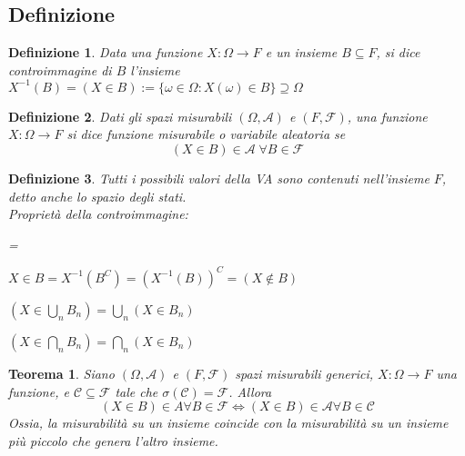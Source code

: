 \documentclass[a4paper,12pt]{article}
\theoremstyle{break}
\newtheorem{theorem}{Teorema}[section]
\newtheorem{definition}{Definizione}[section]
\numberwithin{equation}{section}
\begin{document}
\subsection{Definizione}
\begin{definition}
  Data una funzione \(X : \Omega \to F\) e un insieme \(B \subseteq F\), si dice controimmagine di \(B\) l'insieme \(X^{-1}(B) = (X \in B) := \{\omega \in \Omega : X (\omega) \in B\} \supseteq \Omega\) 
\end{definition}
\begin{definition}
  Dati gli spazi misurabili \((\Omega, \mathcal{A})\) e \((F, \mathcal{F})\), una funzione \(X : \Omega \to F\) si dice funzione misurabile o variabile aleatoria se 
  \[
    (X \in B) \in \mathcal{A} \; \forall B \in \mathcal{F}
  \]
\end{definition}
\begin{definition}
  Tutti i possibili valori della VA sono contenuti nell'insieme \(F\), detto anche lo spazio degli stati. \\
  Proprietà della controimmagine:
  \begin{itemize}
    {\everymath = {\displaystyle}
    \item \(X \in B = X^{-1}(B^C) = (X^{-1}(B))^C = (X \not \in B)\)
    \item \((X \in \bigcup_n B_n) = \bigcup_n (X \in B_n)\)
    \item \((X \in \bigcap_n B_n) = \bigcap_n (X \in B_n)\)
    }
    \end{itemize}
\end{definition}
\begin{theorem}
  Siano \((\Omega, \mathcal{A})\) e \((F, \mathcal{F})\) spazi misurabili generici, \(X : \Omega \to F\) una funzione, e \(\mathcal{C} \subseteq \mathcal{F}\) tale che \(\sigma(\mathcal{C}) = \mathcal{F}\). Allora 
  \[
    (X \in B) \in A \forall B \in \mathcal{F} \Longleftrightarrow (X \in B) \in \mathcal{A} \forall B \in \mathcal{C}
  \]
  Ossia, la misurabilità su un insieme coincide con la misurabilità su un insieme più piccolo che genera l'altro insieme.
\end{theorem}
\end{document}
